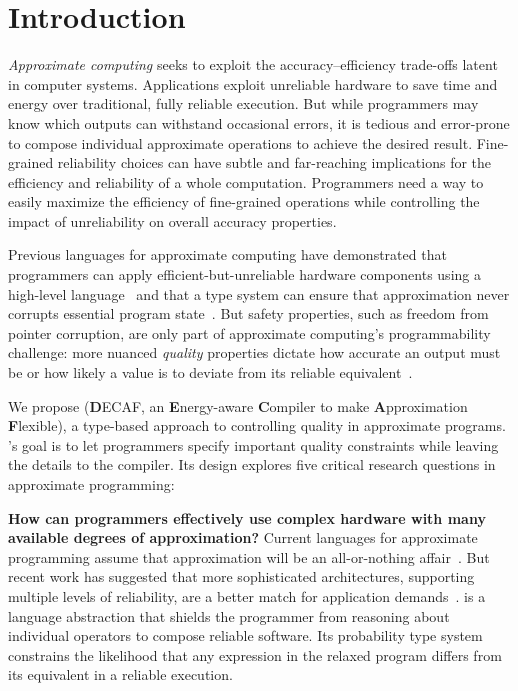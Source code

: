 \documentclass[10pt,nocopyrightspace,preprint]{sigplanconf}
\begin{document}
\section{Introduction}

\emph{Approximate computing} seeks to exploit the accuracy--efficiency
trade-offs latent in computer systems.
Applications exploit unreliable hardware to save
time and energy over traditional, fully reliable execution.
But while programmers may know which outputs can withstand occasional errors,
it is tedious and error-prone to compose individual approximate operations to
achieve the desired result.
Fine-grained reliability choices can have subtle and far-reaching implications
for the efficiency and reliability of a whole computation.
Programmers need a way to easily maximize the efficiency of fine-grained
operations while controlling the impact of unreliability on overall accuracy
properties.

Previous languages for approximate computing
have demonstrated that programmers can apply efficient-but-unreliable hardware components using a high-level
language~\cite{rely, energytypes}
and that a type system can ensure that approximation never corrupts essential
program state~\cite{enerj}.
But safety properties, such as freedom from pointer corruption, are only part
of approximate computing's programmability challenge:
more nuanced \emph{quality} properties dictate how accurate an output
must be or how likely a value is to deviate from its reliable equivalent~\cite{passert, rely}.

We propose \lang (\textbf{D}ECAF, an \textbf{E}nergy-aware \textbf{C}ompiler
to make \textbf{A}pproximation \textbf{F}lexible), a type-based approach
to controlling quality in approximate programs.
\lang's goal is to let programmers specify important quality constraints while
leaving the details to the compiler.
Its design explores five critical research questions in approximate
programming:

\textbf{How can programmers effectively use complex hardware with many
available degrees of approximation?}
Current languages for approximate programming assume that approximation
will be an all-or-nothing affair~\cite{enerj, rely, chisel}.
But recent work has suggested that more sophisticated architectures,
supporting
multiple levels of reliability, are a better match for
application demands~\cite{quora}.
\lang is a language abstraction that shields the programmer from reasoning
about individual operators to compose reliable software.
Its probability type system constrains the likelihood that any expression in
the relaxed program differs from its equivalent in a reliable execution.
\end{document}
